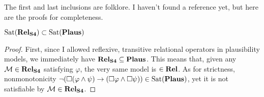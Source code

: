\documentclass[letterpaper]{article}
\begin{document}
The first and last inclusions are folklore.  I haven't found a reference yet, but here are the proofs for completeness.

\begin{proposition}
    $\mathrm{Sat}( \textrm{\textbf{Rel}}_\textrm{\textbf{S4}} ) \subset \mathrm{Sat}( \textrm{\textbf{Plaus}} )$
\end{proposition}
\begin{proof}
    First, since I allowed reflexive, transitive relational operators in plausibility models, we immediately have $\textrm{\textbf{Rel}}_\textrm{\textbf{S4}} \subseteq \textrm{\textbf{Plaus}}$.  This means that, given any $\mathcal{M} \in \textrm{\textbf{Rel}}_\textrm{\textbf{S4}}$ satisfying $\varphi$, the very same model is $\in \textrm{\textbf{Rel}}$.  As for strictness, nonmonotonicity $\neg (\Box(\varphi \land \psi) \to (\Box \varphi \land \Box \psi)) \in \mathrm{Sat}( \textrm{\textbf{Plaus}} )$, yet it is not satisfiable by $\mathcal{M} \in \textrm{\textbf{Rel}}_\textrm{\textbf{S4}}$.
\end{proof}

    
    
    
\end{document}
